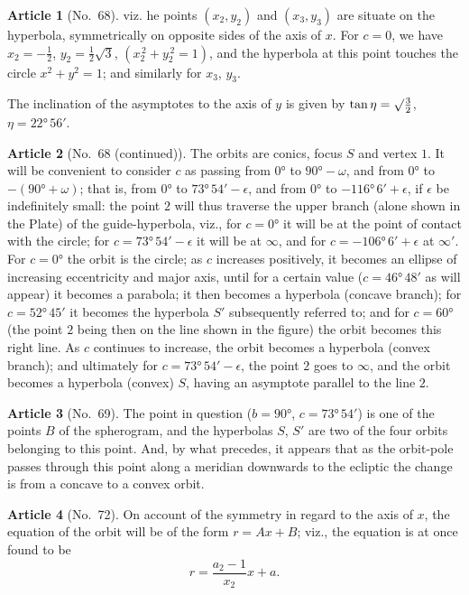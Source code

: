 \documentclass[11pt,a4paper]{article}
\theoremstyle{definition}
\newtheorem{art}{Article}
\begin{document}
\begin{art}[No.~68]
viz.	he points $(x_2, y_2)$ and $(x_3, y_3)$ are situate on the hyperbola, symmetrically on opposite sides of the axis of $x$. For $c=0$, we have $x_2 = -\frac{1}{2}$, $y_2 = \frac{1}{2}\surd 3$, $(x_2^{\,2} + y_2^{\,2} = 1)$, and the hyperbola at this point touches the circle $x^2 + y^2 = 1$; and similarly for $x_3$, $y_3$.

The inclination of the asymptotes to the axis of $y$ is given by $\tan\eta = \surd\frac{3}{2}$, $\eta = 22°\, 56'$.
\end{art}

\begin{art}[No.~68 (continued)]
The orbits are conics, focus $S$ and vertex $1$. It will be convenient to consider $c$ as passing from $0°$ to $90° - \omega$, and from $0°$ to $-(90° + \omega)$; that is, from $0°$ to $73°\, 54' - \epsilon$, and from $0°$ to $-116°\, 6' + \epsilon$, if $\epsilon$ be indefinitely small: the point $2$ will thus traverse the upper branch (alone shown in the Plate) of the guide-hyperbola, viz., for $c=0°$ it will be at the point of contact with the circle; for $c=73°\, 54' - \epsilon$ it will be at $\infty$, and for $c=-106°\, 6' + \epsilon$ at $\infty'$. For $c=0°$ the orbit is the circle; as $c$ increases positively, it becomes an ellipse of increasing eccentricity and major axis, until for a certain value ($c = 46°\, 48'$ as will appear) it becomes a parabola; it then becomes a hyperbola (concave branch); for $c = 52°\, 45'$ it becomes the hyperbola $S'$ subsequently referred to; and for $c = 60°$ (the point $2$ being then on the line shown in the figure) the orbit becomes this right line. As $c$ continues to increase, the orbit becomes a hyperbola (convex branch); and ultimately for $c = 73°\, 54' - \epsilon$, the point $2$ goes to $\infty$, and the orbit becomes a hyperbola (convex) $S$, having an asymptote parallel to the line $2$.
\end{art}

\begin{art}[No.~69]
The point in question ($b = 90°$, $c = 73°\, 54'$) is one of the points $B$ of the spherogram, and the hyperbolas $S$, $S'$ are two of the four orbits belonging to this point. And, by what precedes, it appears that as the orbit-pole passes through this point along a meridian downwards to the ecliptic the change is from a concave to a convex orbit.
\end{art}

\begin{art}[No.~72]
On account of the symmetry in regard to the axis of $x$, the equation of the orbit will be of the form $r = Ax + B$; viz., the equation is at once found to be
\[
r = \frac{a_2 - 1}{x_2}x + a.
\]
\end{art}
\end{document}

